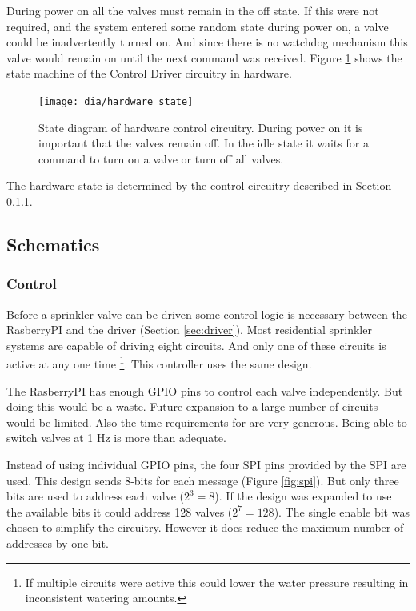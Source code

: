 \documentclass{article}
\begin{document}
During power on all the valves must remain in the off state.
If this were not required, and the system entered some random
state during power on, a valve could be inadvertently turned on.
And since there is no watchdog mechanism this valve would remain
on until the next command was received.
Figure \ref{fig:hwstate} shows the state machine of the
Control Driver circuitry in hardware.

\begin{figure}[h!]
\centering
\texttt{[image: dia/hardware\_state]}
\caption{State diagram of hardware control circuitry.
During power on it is important that the valves remain off.
In the idle state it waits for a command to turn on a valve or
turn off all valves.}\label{fig:hwstate}
\end{figure}

The hardware state is determined by the control circuitry
described in Section \ref{sec:control}.


\clearpage
\FloatBarrier
\subsection{Schematics}

\FloatBarrier
\subsubsection{Control}
\label{sec:control}

Before a sprinkler valve can be driven some control logic is necessary
between the RasberryPI and the driver (Section \ref{sec:driver}).
Most residential sprinkler systems are capable of driving eight circuits.
And only one of these circuits is active at any one time
\footnote{If multiple circuits were active this could lower the
water pressure resulting in inconsistent watering amounts.}.
This controller uses the same design.

The RasberryPI has enough GPIO pins to control each valve independently.
But doing this would be a waste.
Future expansion to a large number of circuits would be limited.
Also the time requirements for are very generous.
Being able to switch valves at 1 Hz is more than adequate.

Instead of using individual GPIO pins, the four SPI pins provided by
the SPI are used.
This design sends 8-bits for each message (Figure \ref{fig:spi}).
But only three bits are used to address each valve ($2^3 = 8$).
If the design was expanded to use the available bits
it could address 128 valves ($2^7 = 128$).
The single enable bit was chosen to simplify the circuitry.
However it does reduce the maximum number of addresses by one bit.
\end{document}
